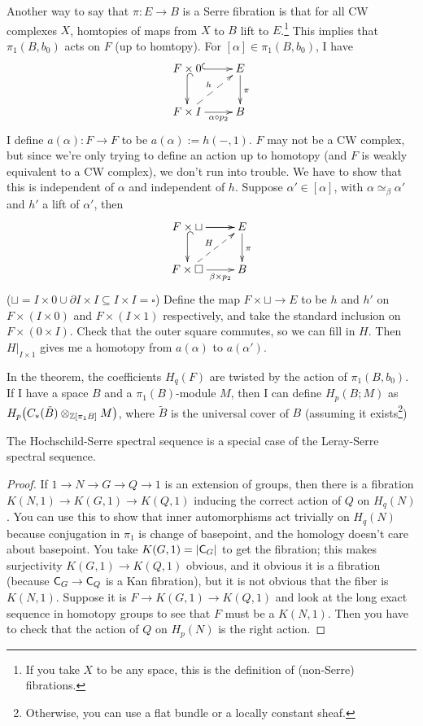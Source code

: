 Another way to say that $\pi\colon E\to B$ is a Serre fibration is that for all CW complexes $X$, homtopies of maps from $X$ to $B$ lift to $E$.\footnote{If you take $X$ to be any space, this is the definition of (non-Serre) fibrations.} This implies that $\pi_1(B,b_0)$ acts on $F$ (up to homtopy). For $[\alpha]\in \pi_1(B,b_0)$, I have
\[\xymatrix{
 F\times 0 \ar@{^(->}[r] \ar@{^(->}[d] & E\ar[d]^\pi\\
 F\times I \ar@{-->}[ur]^h \ar[r]_-{\alpha\circ p_2} & B
}\]
I define $a(\alpha)\colon F\to F$ to be $a(\alpha):=h(-,1)$. $F$ may not be a CW complex, but since we're only trying to define an action up to homotopy (and $F$ is weakly equivalent to a CW complex), we don't run into trouble. We have to show that this is independent of $\alpha$ and independent of $h$. Suppose $\alpha'\in [\alpha]$, with $\alpha\simeq_\beta \alpha'$ and $h'$ a lift of $\alpha'$, then
\[\xymatrix{
 F\times \sqcup \ar[r] \ar@{^(->}[d] \ar[r] & E\ar[d]^\pi\\
 F\times \square \ar@{-->}[ur]^H \ar[r]_-{\beta\times p_2} & B
}\]
($\sqcup = I\times 0\cup \partial I\times I\subseteq I\times I=\square$) Define the map $F\times \sqcup\to E$ to be $h$ and $h'$ on $F\times (I\times 0)$ and $F\times (I\times 1)$ respectively, and take the standard inclusion on $F\times(0\times I)$. Check that the outer square commutes, so we can fill in $H$. Then $H|_{I\times 1}$ gives me a homotopy from $a(\alpha)$ to $a(\alpha')$.

In the theorem, the coefficients $H_q(F)$ are twisted by the action of $\pi_1(B,b_0)$. If I have a space $B$ and a $\pi_1(B)$-module $M$, then I can define $H_p(B;M)$ as $H_p\bigl(C_*(\tilde B)\otimes_{\mathbb{Z}[\pi_1 B]} M\bigr)$, where $\tilde B$ is the universal cover of $B$ (assuming it exists\footnote{Otherwise, you can use a flat bundle or a locally constant sheaf. })

\begin{claim}
 The Hochschild-Serre spectral sequence is a special case of the Leray-Serre spectral sequence.
\end{claim}
\begin{proof}
 If $1\to N\to G\to Q\to 1$ is an extension of groups, then there is a fibration $K(N,1)\to K(G,1)\to K(Q,1)$ inducing the correct action of $Q$ on $H_q(N)$. You can use this to show that inner automorphisms act trivially on $H_q(N)$ because conjugation in $\pi_1$ is change of basepoint, and the homology doesn't care about basepoint. You take $K(G,1)=|\text{\sf C}_G|$ to get the fibration; this makes surjectivity $K(G,1)\to K(Q,1)$ obvious, and it obvious it is a fibration (because $\text{\sf C}_G\to \text{\sf C}_Q$ is a Kan fibration), but it is not obvious that the fiber is $K(N,1)$. Suppose it is $F\to K(G,1)\to K(Q,1)$ and look at the long exact sequence in homotopy groups to see that $F$ must be a $K(N,1)$. Then you have to check that the action of $Q$ on $H_p(N)$ is the right action.
\end{proof}

